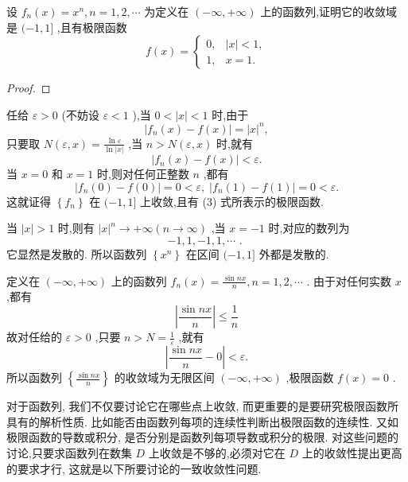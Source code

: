 \begin{example}

\end{example}
设 \({f}_{n}\left( x\right)  = {x}^{n},n = 1,2,\cdots\) 为定义在 \(\left( {-\infty , + \infty }\right)\) 上的函数列,证明它的收敛域是 \(( - 1,1\rbrack\) ,且有极限函数
\[
f\left( x\right)  = \left\{  \begin{array}{ll} 0, & \left| x\right|  < 1, \\  1, & x = 1. \end{array}\right.  \tag{3}
\]
\begin{proof}

\end{proof}
任给 \(\varepsilon  > 0\) (不妨设 \(\varepsilon  < 1\) ),当 \(0 < \left| x\right|  < 1\) 时,由于
\[
\left| {{f}_{n}\left( x\right)  - f\left( x\right) }\right|  = {\left| x\right| }^{n},
\]
只要取 \(N\left( {\varepsilon ,x}\right)  = \frac{\ln \varepsilon }{\ln \left| x\right| }\) ,当 \(n > N\left( {\varepsilon ,x}\right)\) 时,就有
\[
\left| {{f}_{n}\left( x\right)  - f\left( x\right) }\right|  < \varepsilon .
\]
当 \(x = 0\) 和 \(x = 1\) 时,则对任何正整数 \(n\) ,都有
\[
\left| {{f}_{n}\left( 0\right)  - f\left( 0\right) }\right|  = 0 < \varepsilon ,\;\left| {{f}_{n}\left( 1\right)  - f\left( 1\right) }\right|  = 0 < \varepsilon .
\]
这就证得 \(\left\{  {f}_{n}\right\}\) 在 \(( - 1,1\rbrack\) 上收敛,且有 (3) 式所表示的极限函数.

当 \(\left| x\right|  > 1\) 时,则有 \({\left| x\right| }^{n} \rightarrow   + \infty \left( {n \rightarrow  \infty }\right)\) ,当 \(x =  - 1\) 时,对应的数列为
\[
- 1,1, - 1,1,\cdots \text{ . }
\]
它显然是发散的. 所以函数列 \(\left\{  {x}^{n}\right\}\) 在区间 \(( - 1,1\rbrack\) 外都是发散的.

\begin{example}

\end{example}
定义在 \(\left( {-\infty , + \infty }\right)\) 上的函数列 \({f}_{n}\left( x\right)  = \frac{\sin {nx}}{n},n = 1,2,\cdots\) . 由于对任何实数 \(x\) ,都有
\[
\left| \frac{\sin {nx}}{n}\right|  \leq  \frac{1}{n}
\]
故对任给的 \(\varepsilon  > 0\) ,只要 \(n > N = \frac{1}{\varepsilon }\) ,就有
\[
\left| {\frac{\sin {nx}}{n} - 0}\right|  < \varepsilon .
\]
所以函数列 \(\left\{  \frac{\sin {nx}}{n}\right\}\) 的收敛域为无限区间 \(\left( {-\infty , + \infty }\right)\) ,极限函数 \(f\left( x\right)  = 0\) .

对于函数列, 我们不仅要讨论它在哪些点上收敛, 而更重要的是要研究极限函数所具有的解析性质. 比如能否由函数列每项的连续性判断出极限函数的连续性. 又如极限函数的导数或积分, 是否分别是函数列每项导数或积分的极限. 对这些问题的讨论,只要求函数列在数集 \(D\) 上收敛是不够的,必须对它在 \(D\) 上的收敛性提出更高的要求才行, 这就是以下所要讨论的一致收敛性问题.

